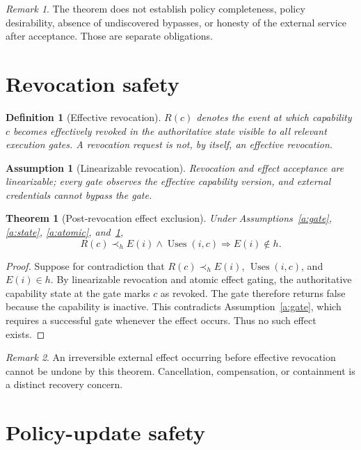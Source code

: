 \documentclass[11pt,a4paper]{article}
\newtheorem{definition}{Definition}[section]
\newtheorem{assumption}{Assumption}[section]
\newtheorem{theorem}{Theorem}[section]
\theoremstyle{remark}
\newtheorem{remark}{Remark}[section]
\begin{document}
\begin{remark}
The theorem does not establish policy completeness, policy desirability, absence of undiscovered bypasses, or honesty of the external service after acceptance. Those are separate obligations.
\end{remark}

\section{Revocation safety}

\begin{definition}[Effective revocation]
$R(c)$ denotes the event at which capability $c$ becomes effectively revoked in the authoritative state visible to all relevant execution gates. A revocation request is not, by itself, an effective revocation.
\end{definition}

\begin{assumption}[Linearizable revocation]\label{a:rev}
Revocation and effect acceptance are linearizable; every gate observes the effective capability version, and external credentials cannot bypass the gate.
\end{assumption}

\begin{theorem}[Post-revocation effect exclusion]\label{thm:revoke}
Under Assumptions~\ref{a:gate}, \ref{a:state}, \ref{a:atomic}, and~\ref{a:rev},
\[
R(c)\prec_h E(i)\land\operatorname{Uses}(i,c)
\Rightarrow E(i)\notin h.
\]
\end{theorem}

\begin{proof}
Suppose for contradiction that $R(c)\prec_h E(i)$, $\operatorname{Uses}(i,c)$, and $E(i)\in h$. By linearizable revocation and atomic effect gating, the authoritative capability state at the gate marks $c$ as revoked. The gate therefore returns false because the capability is inactive. This contradicts Assumption~\ref{a:gate}, which requires a successful gate whenever the effect occurs. Thus no such effect exists.
\end{proof}

\begin{remark}
An irreversible external effect occurring before effective revocation cannot be undone by this theorem. Cancellation, compensation, or containment is a distinct recovery concern.
\end{remark}

\section{Policy-update safety}
\end{document}
